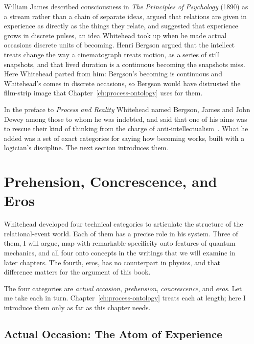 William James described consciousness in \textit{The Principles of Psychology} (1890) as a stream rather than a chain of separate ideas, argued that relations are given in experience as directly as the things they relate, and suggested that experience grows in discrete pulses, an idea Whitehead took up when he made actual occasions discrete units of becoming. Henri Bergson argued that the intellect treats change the way a cinematograph treats motion, as a series of still snapshots, and that lived duration is a continuous becoming the snapshots miss. Here Whitehead parted from him: Bergson's becoming is continuous and Whitehead's comes in discrete occasions, so Bergson would have distrusted the film-strip image that Chapter~\ref{ch:process-ontology} uses for them.

In the preface to \textit{Process and Reality} Whitehead named Bergson, James and John Dewey among those to whom he was indebted, and said that one of his aims was to rescue their kind of thinking from the charge of anti-intellectualism~\citep{Whitehead1929}. What he added was a set of exact categories for saying how becoming works, built with a logician's discipline. The next section introduces them.

\section{Prehension, Concrescence, and Eros}
\label{sec:ch2-prehension}

Whitehead developed four technical categories to articulate the structure of the relational-event world. Each of them has a precise role in his system. Three of them, I will argue, map with remarkable specificity onto features of quantum mechanics, and all four onto concepts in the \bahai writings that we will examine in later chapters. The fourth, eros, has no counterpart in physics, and that difference matters for the argument of this book.

The four categories are \emph{actual occasion}, \emph{prehension}, \emph{concrescence}, and \emph{eros}. Let me take each in turn. Chapter~\ref{ch:process-ontology} treats each at length; here I introduce them only as far as this chapter needs.

\subsection*{Actual Occasion: The Atom of Experience}

